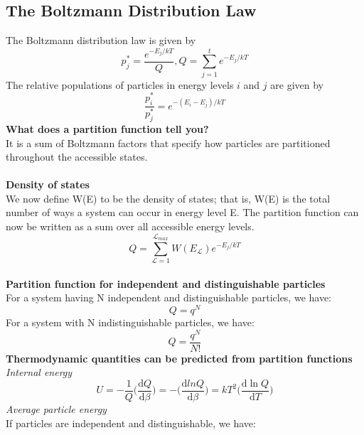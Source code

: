 \documentclass[8pt]{article}
\numberwithin{equation}{section}
\begin{document}
\begin{multicols}{2}
\section{The Boltzmann Distribution Law}
The Boltzmann distribution law is given by 
\begin{equation}
p_{j}^{*}=\frac{e^{-E_{j}/kT}}{Q}, Q=\sum_{j=1}^{t}e^{-E_{j}/kT} \tag{10.9}
\end{equation}
The relative populations of particles in energy levels $i$ and $j$ are given by
\begin{equation}
\frac{p_{i}^{*}}{p_{j}^{*}}=e^{-(E_{i}-E_{j})/kT} \tag{10.10}
\end{equation}
\textbf{What does a partition function tell you?} \\
It is a sum of Boltzmann factors that specify how particles are partitioned throughout the accessible states.  \\ \\
\textbf{Density of states} \\
We now define W(E) to be the density of states; that is, W(E) is the total number of ways a system can occur in energy level E. The partition function can now be written as a sum over all accessible energy levels.
\begin{equation}
Q=\sum_{\mathscr{L}=1}^{\mathscr{L}_{max}}W(E_{\mathscr{L}})e^{-E_{j}/kT} \tag{10.23}
\end{equation}
\pagebreak \\
\textbf{Partition function for independent and distinguishable particles} \\
For a system having N independent and distinguishable particles, we have: 
\begin{equation}
Q=q^{N} \tag{10.28}
\end{equation}
For a system with N indistinguishable particles, we have: 
\begin{equation}
Q=\frac{q^{N}}{N!} \tag{10.30}
\end{equation}
\textbf{Thermodynamic quantities can be predicted from partition functions} \\
\textit{Internal energy} 
\begin{equation}
U=-\frac{1}{Q}\bigg(\frac{\mathrm{d}Q}{\mathrm{d}\beta}\bigg)=-\bigg(\frac{\mathrm{d}ln{Q}}{\mathrm{d}\beta}\bigg)=kT^{2}\bigg(\frac{\mathrm{d}\ln{Q}}{\mathrm{d}T}\bigg) \tag{10.33}
\end{equation}
\textit{Average particle energy} \\
If particles are independent and distinguishable, we have: 

\end{multicols}
\end{document}
